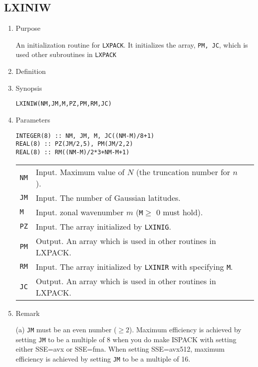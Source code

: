 \documentclass[a4paper]{scrartcl}
\begin{document}
\subsection{LXINIW}

\begin{enumerate}

\item Purpose  

An initialization routine for \texttt{LXPACK}.  
It initializes the array, \texttt{PM, JC},
which is used other subroutines in \texttt{LXPACK}
  
\item Definition

\item Synopsis 
    
\texttt{LXINIW(NM,JM,M,PZ,PM,RM,JC)}

\item Parameters 

\begin{verbatim}
INTEGER(8) :: NM, JM, M, JC((NM-M)/8+1)
REAL(8) :: PZ(JM/2,5), PM(JM/2,2)
REAL(8) :: RM((NM-M)/2*3+NM-M+1)
\end{verbatim}
    
\begin{tabular}{lll}
\texttt{NM} & Input. Maximum value of $N$ (the truncation 
number for $n$).\\
\texttt{JM} & Input. The number of Gaussian latitudes.\\
\texttt{M} & Input. zonal wavenumber $m$ 
(\texttt{M}$\ge$ 0 must hold).\\
\texttt{PZ}  & Input. The array initialized by \texttt{LXINIG}.\\
\texttt{PM}  & Output. An array which is used in other routines in LXPACK.\\
\texttt{RM}  & Input. The array initialized by \texttt{LXINIR} with
specifying \texttt{M}.\\
\texttt{JC}  & Output. An array which is used in other routines in LXPACK.
\end{tabular}

\item Remark

  (a)
\texttt{JM} must be an even number ($\ge 2$).
Maximum efficiency is achieved by setting \texttt{JM} to be 
a multiple of 8 when you do make ISPACK with setting either
SSE=avx or SSE=fma.
When setting SSE=avx512, maximum efficiency is achieved
by setting 
\texttt{JM} to be a multiple of 16.

\end{enumerate}
\end{document}

